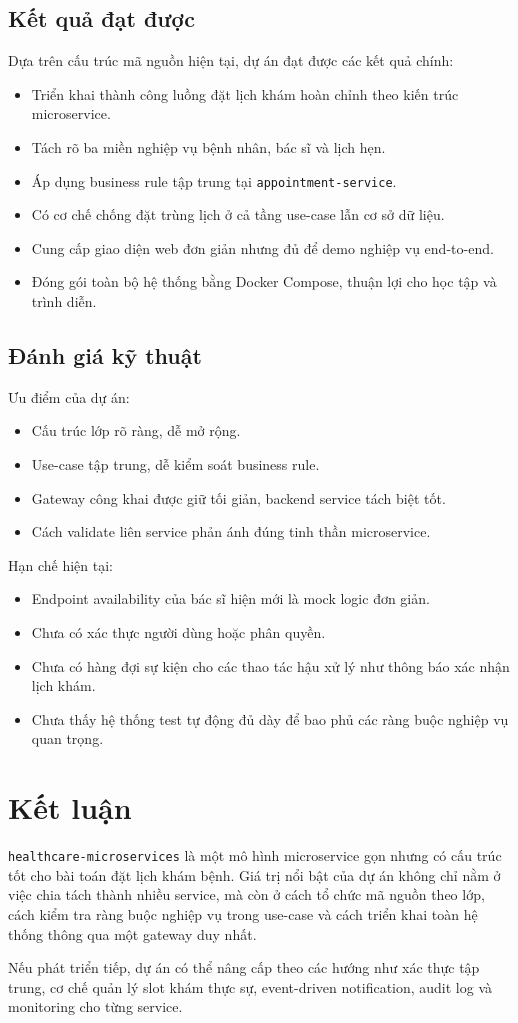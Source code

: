 \documentclass[12pt,a4paper]{article}
\begin{document}
\subsection{Kết quả đạt được}
Dựa trên cấu trúc mã nguồn hiện tại, dự án đạt được các kết quả chính:
\begin{itemize}[leftmargin=1.5em]
  \item Triển khai thành công luồng đặt lịch khám hoàn chỉnh theo kiến trúc microservice.
  \item Tách rõ ba miền nghiệp vụ bệnh nhân, bác sĩ và lịch hẹn.
  \item Áp dụng business rule tập trung tại \texttt{appointment-service}.
  \item Có cơ chế chống đặt trùng lịch ở cả tầng use-case lẫn cơ sở dữ liệu.
  \item Cung cấp giao diện web đơn giản nhưng đủ để demo nghiệp vụ end-to-end.
  \item Đóng gói toàn bộ hệ thống bằng Docker Compose, thuận lợi cho học tập và trình diễn.
\end{itemize}

\subsection{Đánh giá kỹ thuật}
Ưu điểm của dự án:
\begin{itemize}[leftmargin=1.5em]
  \item Cấu trúc lớp rõ ràng, dễ mở rộng.
  \item Use-case tập trung, dễ kiểm soát business rule.
  \item Gateway công khai được giữ tối giản, backend service tách biệt tốt.
  \item Cách validate liên service phản ánh đúng tinh thần microservice.
\end{itemize}

Hạn chế hiện tại:
\begin{itemize}[leftmargin=1.5em]
  \item Endpoint availability của bác sĩ hiện mới là mock logic đơn giản.
  \item Chưa có xác thực người dùng hoặc phân quyền.
  \item Chưa có hàng đợi sự kiện cho các thao tác hậu xử lý như thông báo xác nhận lịch khám.
  \item Chưa thấy hệ thống test tự động đủ dày để bao phủ các ràng buộc nghiệp vụ quan trọng.
\end{itemize}

\section{Kết luận}
\texttt{healthcare-microservices} là một mô hình microservice gọn nhưng có cấu trúc tốt cho bài toán đặt lịch khám bệnh. Giá trị nổi bật của dự án không chỉ nằm ở việc chia tách thành nhiều service, mà còn ở cách tổ chức mã nguồn theo lớp, cách kiểm tra ràng buộc nghiệp vụ trong use-case và cách triển khai toàn hệ thống thông qua một gateway duy nhất.

Nếu phát triển tiếp, dự án có thể nâng cấp theo các hướng như xác thực tập trung, cơ chế quản lý slot khám thực sự, event-driven notification, audit log và monitoring cho từng service.
\end{document}
